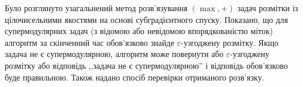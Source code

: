 \chapterConclusion

Було розглянуто узагальнений метод розв’язування $(\max ,+)$ задач розмітки із 
цілочисельними якостями на основі субградієнтного спуску. Показано, що для 
супермодулярних задач (з відомою або невідомою впорядкованістю міток) алгоритм
за скінченний час обов'язково знайде $\varepsilon$-узгоджену розмітку.
Якщо задача не є супермодулярною, алгоритм може повернути або $\varepsilon$-узгоджену
розмітку або відповідь ,,задача не є супермодулярною'' 
і відповідь обов'язково буде правильною. Також
надано спосіб перевірки отриманого розв'язку.   